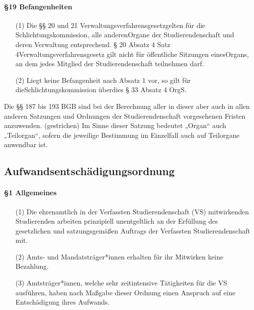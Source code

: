         \paragraph{§19  Befangenheiten}
            \begin{itemize}
                \item[(1)]    Die §§ 20 und 21 Verwaltungsverfahrensgesetzgelten für die Schlichtungskommission, alle anderenOrgane der Studierendenschaft und deren Verwaltung entsprechend. § 20 Absatz 4 Satz 4Verwaltungsverfahrensgesetz gilt nicht für öffentliche Sitzungen einesOrgans, an dem jedes Mitglied der Studierendenschaft teilnehmen darf.
                \item[(2)]    Liegt keine Befangenheit nach Absatz 1 vor, so gilt für dieSchlichtungskommission überdies § 33 Absatz 4 OrgS.
            \end{itemize}
        Die §§ 187 bis 193 BGB sind bei der Berechnung aller in dieser aber auch in allen anderen Satzungen und Ordnungen der Studierendenschaft vorgesehenen Fristen anzuwenden.
            (gestrichen)
        Im Sinne dieser Satzung bedeutet „Organ“ auch „Teilorgan“, sofern die jeweilige Bestimmung im Einzelfall auch auf Teilorgane anwendbar ist.

\subsection{Aufwandsentschädigungsordnung\label{appendix:4}}
        \paragraph{§1 Allgemeines}
            \begin{itemize}
                \item[(1)] Die ehrenamtlich in der Verfassten Studierendenschaft (VS) mitwirkenden Studierenden arbeiten prinzipiell unentgeltlich an der Erfüllung des gesetzlichen und satzungsgemäßen Auftrags der Verfassten Studierendenschaft mit.
                \item[(2)]  Amts- und Mandatsträger*innen erhalten für ihr Mitwirken keine Bezahlung.
                \item[(3)]  Amtsträger*innen, welche sehr zeitintensive Tätigkeiten für die VS ausführen, haben nach Maßgabe dieser Ordnung einen Anspruch auf eine Entschädigung ihres Aufwands.
            \end{itemize}
